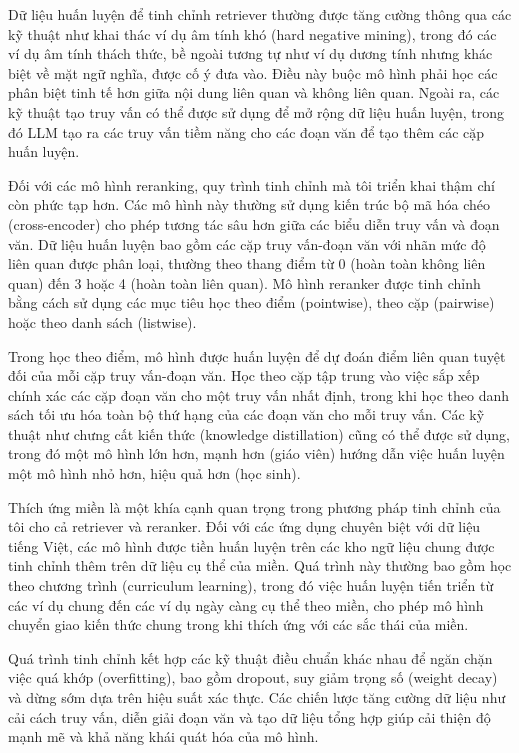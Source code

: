 \documentclass[../main.tex]{subfiles}
\begin{document}
Dữ liệu huấn luyện để tinh chỉnh retriever thường được tăng cường thông qua các kỹ thuật như khai thác ví dụ âm tính khó (hard negative mining), trong đó các ví dụ âm tính thách thức, bề ngoài tương tự như ví dụ dương tính nhưng khác biệt về mặt ngữ nghĩa, được cố ý đưa vào. Điều này buộc mô hình phải học các phân biệt tinh tế hơn giữa nội dung liên quan và không liên quan. Ngoài ra, các kỹ thuật tạo truy vấn có thể được sử dụng để mở rộng dữ liệu huấn luyện, trong đó LLM tạo ra các truy vấn tiềm năng cho các đoạn văn để tạo thêm các cặp huấn luyện.

Đối với các mô hình reranking, quy trình tinh chỉnh mà tôi triển khai thậm chí còn phức tạp hơn. Các mô hình này thường sử dụng kiến trúc bộ mã hóa chéo (cross-encoder) cho phép tương tác sâu hơn giữa các biểu diễn truy vấn và đoạn văn. Dữ liệu huấn luyện bao gồm các cặp truy vấn-đoạn văn với nhãn mức độ liên quan được phân loại, thường theo thang điểm từ 0 (hoàn toàn không liên quan) đến 3 hoặc 4 (hoàn toàn liên quan). Mô hình reranker được tinh chỉnh bằng cách sử dụng các mục tiêu học theo điểm (pointwise), theo cặp (pairwise) hoặc theo danh sách (listwise).

Trong học theo điểm, mô hình được huấn luyện để dự đoán điểm liên quan tuyệt đối của mỗi cặp truy vấn-đoạn văn. Học theo cặp tập trung vào việc sắp xếp chính xác các cặp đoạn văn cho một truy vấn nhất định, trong khi học theo danh sách tối ưu hóa toàn bộ thứ hạng của các đoạn văn cho mỗi truy vấn. Các kỹ thuật như chưng cất kiến thức (knowledge distillation) cũng có thể được sử dụng, trong đó một mô hình lớn hơn, mạnh hơn (giáo viên) hướng dẫn việc huấn luyện một mô hình nhỏ hơn, hiệu quả hơn (học sinh).

Thích ứng miền là một khía cạnh quan trọng trong phương pháp tinh chỉnh của tôi cho cả retriever và reranker. Đối với các ứng dụng chuyên biệt với dữ liệu tiếng Việt, các mô hình được tiền huấn luyện trên các kho ngữ liệu chung được tinh chỉnh thêm trên dữ liệu cụ thể của miền. Quá trình này thường bao gồm học theo chương trình (curriculum learning), trong đó việc huấn luyện tiến triển từ các ví dụ chung đến các ví dụ ngày càng cụ thể theo miền, cho phép mô hình chuyển giao kiến thức chung trong khi thích ứng với các sắc thái của miền.

Quá trình tinh chỉnh kết hợp các kỹ thuật điều chuẩn khác nhau để ngăn chặn việc quá khớp (overfitting), bao gồm dropout, suy giảm trọng số (weight decay) và dừng sớm dựa trên hiệu suất xác thực. Các chiến lược tăng cường dữ liệu như cải cách truy vấn, diễn giải đoạn văn và tạo dữ liệu tổng hợp giúp cải thiện độ mạnh mẽ và khả năng khái quát hóa của mô hình.
\end{document}
